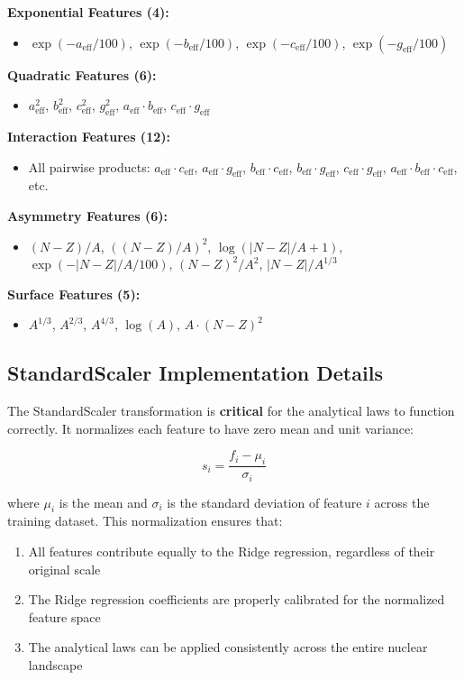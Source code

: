 \documentclass[9pt,twocolumn]{extarticle}
\newcommand{\eff}{\text{eff}}
\begin{document}
\textbf{Exponential Features (4):}
\begin{itemize}
    \item $\exp(-a_{\eff}/100)$, $\exp(-b_{\eff}/100)$, $\exp(-c_{\eff}/100)$, $\exp(-g_{\eff}/100)$
\end{itemize}

\textbf{Quadratic Features (6):}
\begin{itemize}
    \item $a_{\eff}^2$, $b_{\eff}^2$, $c_{\eff}^2$, $g_{\eff}^2$, $a_{\eff} \cdot b_{\eff}$, $c_{\eff} \cdot g_{\eff}$
\end{itemize}

\textbf{Interaction Features (12):}
\begin{itemize}
    \item All pairwise products: $a_{\eff} \cdot c_{\eff}$, $a_{\eff} \cdot g_{\eff}$, $b_{\eff} \cdot c_{\eff}$, $b_{\eff} \cdot g_{\eff}$, $c_{\eff} \cdot g_{\eff}$, $a_{\eff} \cdot b_{\eff} \cdot c_{\eff}$, etc.
\end{itemize}

\textbf{Asymmetry Features (6):}
\begin{itemize}
    \item $(N-Z)/A$, $((N-Z)/A)^2$, $\log(|N-Z|/A + 1)$, $\exp(-|N-Z|/A/100)$, $(N-Z)^2/A^2$, $|N-Z|/A^{1/3}$
\end{itemize}

\textbf{Surface Features (5):}
\begin{itemize}
    \item $A^{1/3}$, $A^{2/3}$, $A^{4/3}$, $\log(A)$, $A \cdot (N-Z)^2$
\end{itemize}

\subsection{StandardScaler Implementation Details}
The StandardScaler transformation is \textbf{critical} for the analytical laws to function correctly. It normalizes each feature to have zero mean and unit variance:

\begin{equation}
s_i = \frac{f_i - \mu_i}{\sigma_i}
\end{equation}

where $\mu_i$ is the mean and $\sigma_i$ is the standard deviation of feature $i$ across the training dataset. This normalization ensures that:

\begin{enumerate}
    \item All features contribute equally to the Ridge regression, regardless of their original scale
    \item The Ridge regression coefficients are properly calibrated for the normalized feature space
    \item The analytical laws can be applied consistently across the entire nuclear landscape
\end{enumerate}
\end{document}
